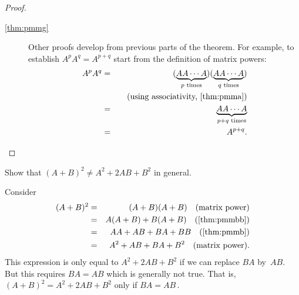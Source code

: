 \begin{proof}
\begin{description}
\item[\ref{thm:pmmg}]
Other proofs develop from previous parts of the theorem.
For example, to establish \(A^pA^q=A^{p+q}\) start from the definition of matrix powers:
\begin{eqnarray*}
A^pA^q&=&(\underbrace{AA\cdots A}_{p\text{ times}})
(\underbrace{AA\cdots A}_{q\text{ times}})
\\&&\quad(\text{using associativity, \autoref{thm:pmma}})
\\&=&\underbrace{AA\cdots A}_{p+q\text{ times}}
\\&=&A^{p+q}.
\end{eqnarray*}

\end{description}
\end{proof}



\begin{example} \label{eg:}
Show that \((A+B)^2\neq A^2+2AB+B^2\)  in general.
\begin{solution} 
Consider
\begin{eqnarray*}
(A+B)^2&=& (A+B)(A+B) \quad(\text{matrix power})
\\&=&A(A+B)+B(A+B) \quad(\text{\autoref{thm:pmmbb}})
\\&=&AA+AB+BA+BB \quad(\text{\autoref{thm:pmmb}})
\\&=&A^2+AB+BA+B^2 \quad(\text{matrix power}).
\end{eqnarray*}
This expression is only equal to \(A^2+2AB+B^2\) if we can replace \(BA\) by~\(AB\).  
But this requires \(BA=AB\) which is generally not true.
That is, \((A+B)^2= A^2+2AB+B^2\) only if \(BA=AB\)\,.
\end{solution}
\end{example}




